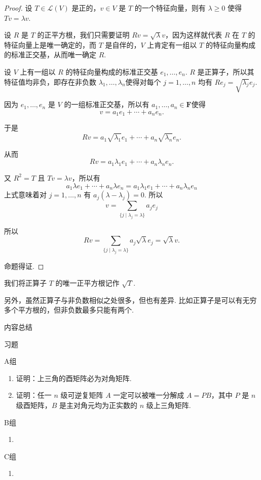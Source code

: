 \begin{proof}
    设 $ T \in \mathcal{L}(V) $ 是正的，$ v \in V $ 是 $ T $ 的一个特征向量，则有 $ \lambda \geqslant 0 $ 使得 $ Tv = \lambda v $.

    设 $ R $ 是 $ T $ 的正平方根，我们只需要证明 $ Rv = \sqrt{\lambda} v $，因为这样就代表 $ R $ 在 $ T $ 的特征向量上是唯一确定的，而 $ T $ 是自伴的，$ V $ 上肯定有一组以 $ T $ 的特征向量构成的标准正交基，从而唯一确定 $ R $.

    设 $ V $ 上有一组以 $ R $ 的特征向量构成的标准正交基 $ e_1, \ldots , e_n $. $ R $ 是正算子，所以其特征值均非负，即存在非负数 $\lambda_1, \ldots , \lambda_n $使得对每个 $ j = 1, \ldots , n $ 均有 $ Re_j = \sqrt{\lambda_j}e_j $.

    因为 $ e_1, \ldots , e_n $ 是 $ V $ 的一组标准正交基，所以有 $ a_1, \ldots , a_n \in \mathbf{F} $使得
    \[ v = a_1e_1 + \cdots + a_ne_n. \]

    于是
    \[ Rv = a_1\sqrt{\lambda_1}e_1 + \cdots + a_n\sqrt{\lambda_n}e_n. \]

    从而
    \[ Rv = a_1\lambda_1e_1 + \cdots + a_n\lambda_ne_n. \]

    又 $ R^{2} = T $ 且 $ Tv = \lambda v $，所以有
    \[ a_1\lambda e_1 + \cdots + a_n\lambda e_n = a_1\lambda_1e_1 + \cdots + a_n\lambda_ne_n \]
    上式意味着对 $ j = 1, \ldots, n $ 有 $ a_j(\lambda - \lambda_j) = 0 $. 所以
    \[ v = \sum_{\{j \mid \lambda_j = \lambda \}} a_je_j \]

    所以
    \[ Rv = \sum_{\{j \mid \lambda_j = \lambda \}} a_j\sqrt{\lambda}e_j = \sqrt{\lambda}v. \]

    命题得证.
\end{proof}

我们将正算子 $ T $ 的唯一正平方根记作 $ \sqrt{T} $.

另外，虽然正算子与非负数相似之处很多，但也有差异. 比如正算子是可以有无穷多个平方根的，但非负数最多只能有两个.

\vspace{2ex}
\centerline{\heiti \Large 内容总结}

\vspace{2ex}
\centerline{\heiti \Large 习题}

\vspace{2ex}
{\kaishu }
\begin{flushright}
    \kaishu

\end{flushright}

\centerline{\heiti A组}
\begin{enumerate}
    \item 证明：上三角的酉矩阵必为对角矩阵.

    \item 证明：任一 $ n $ 级可逆复矩阵 $ A $ 一定可以被唯一分解成 $ A = PB $，其中 $ P $ 是 $ n $ 级酉矩阵，$ B $ 是主对角元均为正实数的 $ n $ 级上三角矩阵.
\end{enumerate}

\centerline{\heiti B组}
\begin{enumerate}
    \item
\end{enumerate}

\centerline{\heiti C组}
\begin{enumerate}
    \item
\end{enumerate}
